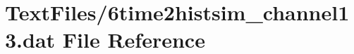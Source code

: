 \hypertarget{6time2histsim__channel13_8dat}{}\section{Text\+Files/6time2histsim\+\_\+channel13.dat File Reference}
\label{6time2histsim__channel13_8dat}
